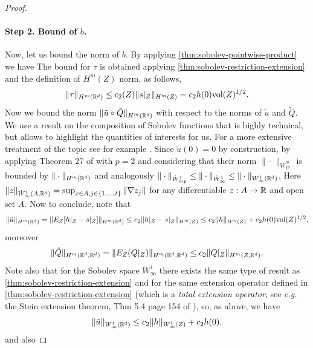\begin{proof}
\paragraph{Step 2. Bound of $b$.}
Now, let us bound the norm of $b$. By applying \cref{thm:sobolev-pointwise-product} we have
The bound for $\tau$ is obtained applying \cref{thm:sobolev-restriction-extension} and the definition of $H^m(Z)$ norm, as follows,
$$\|\tau\|_{H^m(\mathbb R^d)} \leq c_2(Z) \|s|_Z\|_{H^m(Z)} = c_2 h(0) \textrm{vol}(Z)^{1/2}.$$
Now we bound the norm $\|\tilde{u} \circ \tilde{Q}\|_{H^m(\mathbb R^d)}$ with respect to the norms of $\tilde{u}$ and $\tilde{Q}$. We use a result on the composition of Sobolev functions \citep[][Theorem 27]{bourdaud2011composition} that is highly technical, but allows to highlight the quantities of interests for us. For a more extensive treatment of the topic see for example \citet{runst2011sobolev}. Since $\tilde{u}(0) = 0$ by construction, by applying Theorem 27 of \citet{bourdaud2011composition} with $p=2$ and considering that their norm $\|\cdot\|_{\dot{W}_{E^p}^m}$ is bounded by $\|\cdot\|_{H^m(\mathbb R^d)}$ and analogously $\|\cdot\|_{\dot{W}^1_{mp}} \leq \|\cdot\|_{\dot{W}^1_{\infty}} \leq \|\cdot\|_{W^1_\infty(\mathbb R^d)}$,
Here $\|z\|_{\dot{W}^1_\infty(A, \mathbb R^d)} = \sup_{x \in A, j \in \{1,\dots,t\}} \|\nabla z_j\|$ for any differentiable $z:A \to \mathbb R$ and open set $A$.
Now to conclude, note that
$$\|\tilde{u}\|_{H^m(\mathbb R^d)} = \|E_{Z}[h|_Z - s|_Z]\|_{H^m(\mathbb R^d)} \leq c_2 \|h|_Z - s|_Z\|_{H^m(Z)} \leq c_2 \|h\|_{H^m(Z)} + c_2 h(0) \textrm{vol}(Z)^{1/2},$$
moreover
$$\|\tilde{Q}\|_{H^m(\mathbb R^d,\mathbb R^d)} = \|E_Z(Q|_Z)\|_{H^m(\mathbb R^d, \mathbb R^d)} \leq c_2 \|Q|_Z\|_{H^m(Z, \mathbb R^d)}.$$
Note also that for the Sobolev space $W^1_\infty$ there exists the same type of result as \cref{thm:sobolev-restriction-extension} and for the same extension operator defined in \cref{thm:sobolev-restriction-extension} (which is a {\em total extension operator}, see \emph{e.g.\ } the Stein extension theorem, Thm 5.4 page 154 of \citealp{adams2003sobolev}), so, as above, we have
$$\|\tilde{u}\|_{W^1_\infty(\mathbb R^d)} \leq c_2 \|h\|_{W^1_\infty(Z)} + c_2 h(0),$$
and also
\end{proof}

